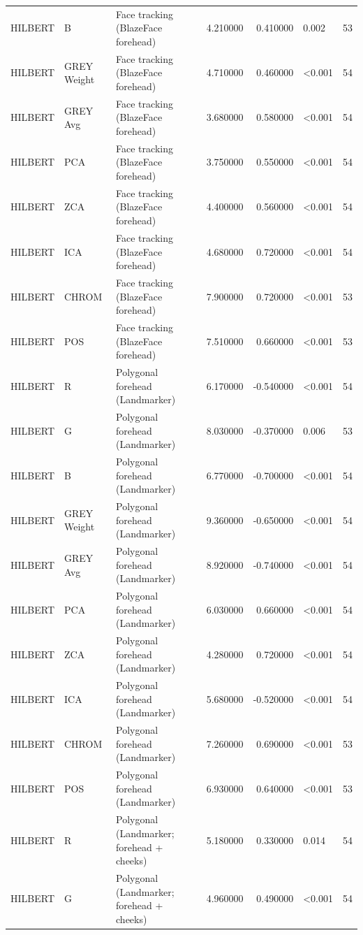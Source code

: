 \begin{table}[htbp]
\begin{tabular}{l l l r r l r}
HILBERT & B & Face tracking (BlazeFace forehead) & 4.210000 & 0.410000 & 0.002 & 53 \\
HILBERT & GREY Weight & Face tracking (BlazeFace forehead) & 4.710000 & 0.460000 & <0.001 & 54 \\
HILBERT & GREY Avg & Face tracking (BlazeFace forehead) & 3.680000 & 0.580000 & <0.001 & 54 \\
HILBERT & PCA & Face tracking (BlazeFace forehead) & 3.750000 & 0.550000 & <0.001 & 54 \\
HILBERT & ZCA & Face tracking (BlazeFace forehead) & 4.400000 & 0.560000 & <0.001 & 54 \\
HILBERT & ICA & Face tracking (BlazeFace forehead) & 4.680000 & 0.720000 & <0.001 & 54 \\
HILBERT & CHROM & Face tracking (BlazeFace forehead) & 7.900000 & 0.720000 & <0.001 & 53 \\
HILBERT & POS & Face tracking (BlazeFace forehead) & 7.510000 & 0.660000 & <0.001 & 53 \\
HILBERT & R & Polygonal forehead (Landmarker) & 6.170000 & -0.540000 & <0.001 & 54 \\
HILBERT & G & Polygonal forehead (Landmarker) & 8.030000 & -0.370000 & 0.006 & 53 \\
HILBERT & B & Polygonal forehead (Landmarker) & 6.770000 & -0.700000 & <0.001 & 54 \\
HILBERT & GREY Weight & Polygonal forehead (Landmarker) & 9.360000 & -0.650000 & <0.001 & 54 \\
HILBERT & GREY Avg & Polygonal forehead (Landmarker) & 8.920000 & -0.740000 & <0.001 & 54 \\
HILBERT & PCA & Polygonal forehead (Landmarker) & 6.030000 & 0.660000 & <0.001 & 54 \\
HILBERT & ZCA & Polygonal forehead (Landmarker) & 4.280000 & 0.720000 & <0.001 & 54 \\
HILBERT & ICA & Polygonal forehead (Landmarker) & 5.680000 & -0.520000 & <0.001 & 54 \\
HILBERT & CHROM & Polygonal forehead (Landmarker) & 7.260000 & 0.690000 & <0.001 & 53 \\
HILBERT & POS & Polygonal forehead (Landmarker) & 6.930000 & 0.640000 & <0.001 & 53 \\
HILBERT & R & Polygonal (Landmarker; forehead + cheeks) & 5.180000 & 0.330000 & 0.014 & 54 \\
HILBERT & G & Polygonal (Landmarker; forehead + cheeks) & 4.960000 & 0.490000 & <0.001 & 54 \\

\end{tabular}
\end{table}
